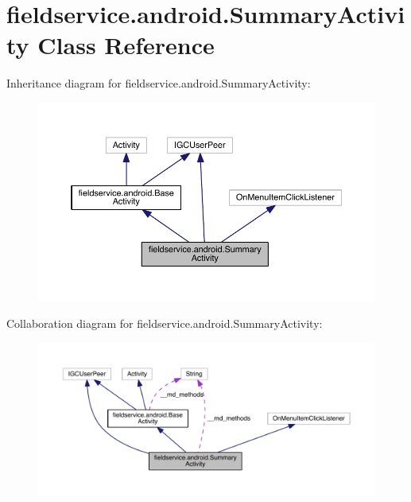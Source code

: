 \hypertarget{classfieldservice_1_1android_1_1_summary_activity}{\section{fieldservice.\+android.\+Summary\+Activity Class Reference}
\label{classfieldservice_1_1android_1_1_summary_activity}
}


Inheritance diagram for fieldservice.\+android.\+Summary\+Activity\+:
\nopagebreak
\begin{figure}[H]
\begin{center}
\leavevmode
\includegraphics[width=350pt]{classfieldservice_1_1android_1_1_summary_activity__inherit__graph}
\end{center}
\end{figure}


Collaboration diagram for fieldservice.\+android.\+Summary\+Activity\+:
\nopagebreak
\begin{figure}[H]
\begin{center}
\leavevmode
\includegraphics[width=350pt]{classfieldservice_1_1android_1_1_summary_activity__coll__graph}
\end{center}
\end{figure}

